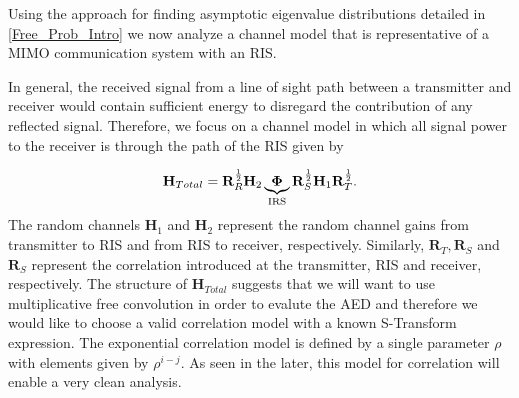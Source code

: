 Using the approach for finding asymptotic eigenvalue distributions detailed in \ref{Free_Prob_Intro} we now analyze a channel model that is representative of a MIMO communication system with an RIS. 
\par
In general, the received signal from a line of sight path between a transmitter and receiver would contain  sufficient energy to disregard the contribution of any reflected signal.  Therefore, we focus on a channel model in which all signal power to the receiver is through the path of the RIS  given by

	\begin{equation}\label{correlated_channel}
	\mathbf{H}_{Total} = \mathbf{R}_{R}^{\frac{1}{2}}\mathbf{H}_{2}\underbrace{\boldsymbol{\Phi}}_{\text{IRS}}\mathbf{R}_{S}^{\frac{1}{2}}\mathbf{H}_{1}\mathbf{R}_{T}^{\frac{1}{2}}.
	\end{equation}
The random channels $\mathbf{H}_{1}$ and $\mathbf{H}_{2}$ represent the random channel gains from transmitter to RIS and from RIS to receiver, respectively. Similarly, $ \mathbf{R}_{T},  \mathbf{R}_{S} $ and  $\mathbf{R}_{S}$ represent the correlation introduced at the transmitter, RIS and receiver, respectively. 
The structure of $\mathbf{H}_{Total}$ suggests that we will want to use multiplicative free convolution in order to evalute the AED and therefore we would like to choose a   valid correlation model with a known S-Transform expression. 
The exponential correlation model is defined by a single parameter $\rho$ with elements given by $\rho^{i-j}$.
As seen in the later, this model for correlation will enable a very clean analysis.
\par

